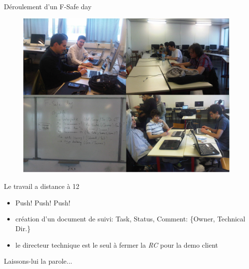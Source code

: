 \begin{frame}{Déroulement d'un F-Safe day}
  \begin{figure}
    \includegraphics[scale=0.27]{img/FSafeDay.png}
  \end{figure} 
\end{frame}

\begin{frame}{Le travail a distance à 12}
  \begin{block}{}
    \begin{itemize}
      \item Push! Push! Push!
      \item création d'un document de suivi: Task, Status, Comment: \{Owner, Technical Dir.\}
      \item le directeur technique est le seul à fermer la \emph{RC} pour la demo client
    \end{itemize}
  \end{block}

  Laissons-lui la parole...
\end{frame}

